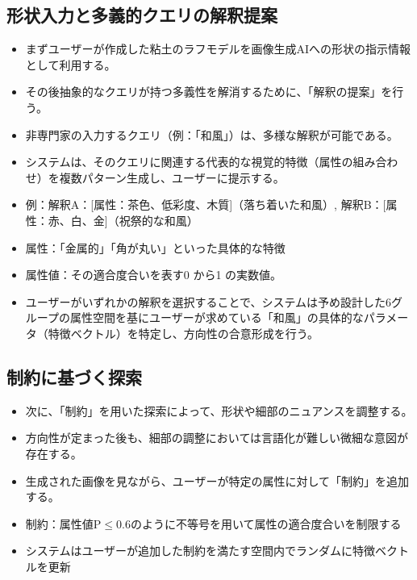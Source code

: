 \documentclass[dvipdfmx]{jlreq}
\begin{document}
\subsection{形状入力と多義的クエリの解釈提案}
\begin{itemize}
  \item まずユーザーが作成した粘土のラフモデルを画像生成AIへの形状の指示情報として利用する。
  \item その後抽象的なクエリが持つ多義性を解消するために、「解釈の提案」を行う。
  \item 非専門家の入力するクエリ（例：「和風」）は、多様な解釈が可能である。
  \item システムは、そのクエリに関連する代表的な視覚的特徴（属性の組み合わせ）を複数パターン生成し、ユーザーに提示する。
  \item 例：解釈A：[属性：茶色、低彩度、木質]（落ち着いた和風）, 解釈B：[属性：赤、白、金]（祝祭的な和風）
  \item 属性：「金属的」「角が丸い」といった具体的な特徴
  \item 属性値：その適合度合いを表す0 から1 の実数値。
  \item ユーザーがいずれかの解釈を選択することで、システムは予め設計した6グループの属性空間を基にユーザーが求めている「和風」の具体的なパラメータ（特徴ベクトル）を特定し、方向性の合意形成を行う。
\end{itemize}

\subsection{制約に基づく探索}
\begin{itemize}
  \item 次に、「制約」を用いた探索によって、形状や細部のニュアンスを調整する。
  \item 方向性が定まった後も、細部の調整においては言語化が難しい微細な意図が存在する。
  \item 生成された画像を見ながら、ユーザーが特定の属性に対して「制約」を追加する。
  \item 制約：属性値P$\le$0.6のように不等号を用いて属性の適合度合いを制限する
  \item システムはユーザーが追加した制約を満たす空間内でランダムに特徴ベクトルを更新
\end{itemize}
\end{document}
